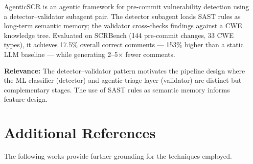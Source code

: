 AgenticSCR is an agentic framework for pre-commit vulnerability detection using a
detector--validator subagent pair. The detector subagent loads SAST rules as
long-term semantic memory; the validator cross-checks findings against a CWE
knowledge tree. Evaluated on SCRBench (144 pre-commit changes, 33 CWE types),
it achieves 17.5\% overall correct comments --- 153\% higher than a static LLM
baseline --- while generating 2--5$\times$ fewer comments.

\textbf{Relevance:} The detector--validator pattern motivates the pipeline design
where the ML classifier (detector) and agentic triage layer (validator) are
distinct but complementary stages. The use of SAST rules as semantic memory
informs feature design.

\section{Additional References}
\label{sec:additional}

The following works provide further grounding for the techniques employed.

